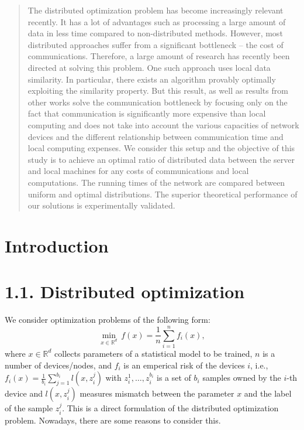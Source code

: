 \documentclass{article}
\theoremstyle{definition}
\theoremstyle{plain}
\begin{document}
\begin{abstract}
The distributed optimization problem has become increasingly relevant recently. It has a lot of advantages such as processing a large amount of data in less time compared to non-distributed methods. However, most distributed approaches suffer from a significant bottleneck -- the cost of communications. Therefore, a large amount of research has recently been directed at solving this problem. One such approach uses local data similarity. In particular, there exists an algorithm provably optimally exploiting the similarity property. But this result, as well as results from other works solve the communication bottleneck by focusing only on the fact that communication is significantly more expensive than local computing and does not take into account the various capacities of network devices and the different relationship between communication time and local computing expenses. We consider this setup and the objective of this study is to achieve an optimal ratio of distributed data between the server and local machines for any costs of communications and local computations. The running times of the network are compared between uniform and optimal distributions. The superior theoretical performance of our solutions is experimentally validated.
\end{abstract}


\section{Introduction}

\section*{1.1. Distributed optimization}

We consider optimization problems of the following form:
\begin{equation}
    \label{eq:1}
    \underset{x\in \mathbb{R}^d}{\min} ~ f(x) = \frac{1}{n} \sum \limits_{i = 1}^{n} f _i(x),
\end{equation}
where $x\in\mathbb{R}^d$ collects parameters of a statistical model to be trained, $n$ is a number of devices/nodes, and $f_i$ is an emperical risk of the devices $i$, i.e., $f_i(x) = \frac{1}{b_i}\sum_{j = 1}^{b_i} l(x, z_i^j)$ with $z_i^1, \ldots ,z_i^{b_i}$ is a set of $b_i$ samples owned by the $i$-th device and $l(x, z_i^j)$ measures mismatch between the parameter $x$ and the label of the sample $z_i^j$. This is a direct formulation of the distributed optimization problem. Nowadays, there are some reasons to consider this.
\end{document}
